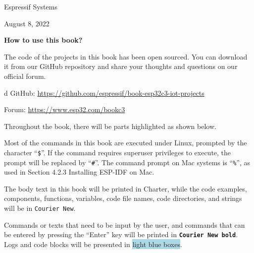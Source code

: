 \documentclass[a4paper,12pt]{book}
\begin{document}
{\vspace{6pt}
\RaggedLeft
Espressif Systems

August 8, 2022

}


\newpage
\begin{center}
    \textcolor{Title}{\LARGE\bfseries How to use this book?}
\end{center}

\vspace{6pt}
The code of the projects in this book has been open sourced. You can download it from our GitHub repository and share your thoughts and questions on our official forum.

\begin{tabular}{d}
    GitHub: \url{https://github.com/espressif/book-esp32c3-iot-projects}
    
    Forum: \url{https://www.esp32.com/bookc3}
\end{tabular}

Throughout the book, there will be parts highlighted as shown below.


\vspace{6pt}

Most of the commands in this book are executed under Linux, prompted by the character “\verb|$|”. If the command requires superuser privileges to execute, the prompt will be replaced by “\verb|#|”. The command prompt on Mac systems is “\verb|%|”, as used in Section 4.2.3 Installing ESP-IDF on Mac.

The body text in this book will be printed in Charter, while the code examples, components, functions, variables, code file names, code directories, and strings will be in \texttt{Courier New}.

Commands or texts that need to be input by the user, and commands that can be entered by pressing the “Enter” key will be printed in \textbf{\texttt{Courier New bold}}. Logs and code blocks will be presented in \colorbox{LightBlue}{light blue boxes}.
\end{document}
